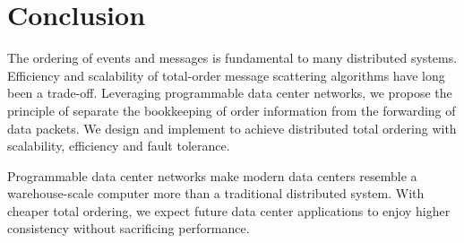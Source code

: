 \section{Conclusion}
\label{sec:conclusion}

The ordering of events and messages is fundamental to many distributed systems. Efficiency and scalability of total-order message scattering algorithms have long been a trade-off. Leveraging programmable data center networks, we propose the principle of separate the bookkeeping of order information from the forwarding of data packets. We design and implement \sys to achieve distributed total ordering with scalability, efficiency and fault tolerance.

Programmable data center networks make modern data centers resemble a warehouse-scale computer more than a traditional distributed system. With cheaper total ordering, we expect future data center applications to enjoy higher consistency without sacrificing performance.